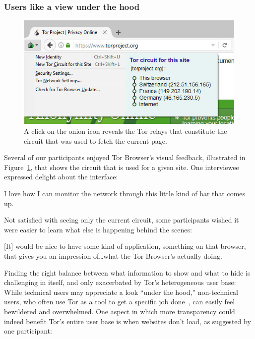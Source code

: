 \subsubsection{Users like a view under the hood}

\begin{figure}[t]
    \centering
    \includegraphics[width=\linewidth]{figures/tor-button-screenshot.jpg}
    \caption{A click on the onion icon reveals the Tor relays that constitute
    the circuit that was used to fetch the current page.}
    \label{fig:tor-button}
\end{figure}

Several of our participants enjoyed Tor Browser's visual feedback, illustrated
in Figure~\ref{fig:tor-button}, that shows the circuit that is used for a given
site.  One interviewee expressed delight about the interface:

\begin{displayquote}
I love how I can monitor the network through this little kind of bar that comes
up.
\end{displayquote}

Not satisfied with seeing only the current circuit, some participants wished it
were easier to learn what else is happening behind the scenes:

\begin{displayquote}
{[It]} would be nice to have some kind of application, something on that browser,
that gives you an impression of\dots what the Tor Browser's actually doing.
\end{displayquote}

Finding the right balance between what information to show and what to hide is
challenging in itself, and only exacerbated by Tor's heterogeneous user base:
While technical users may appreciate a look ``under the hood,'' non-technical
users, who often use Tor as a tool to get a specific job
done~\cite[\S~4.3.2]{Gallagher2017a}, can easily feel bewildered and
overwhelmed.  One aspect in which more transparency could indeed benefit Tor's
entire user base is when websites don't load, as suggested by one participant:

